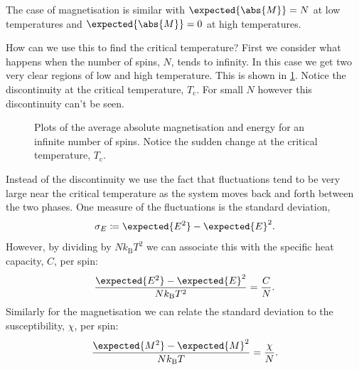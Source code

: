 \documentclass[fleqn]{NotesClass}
\newcommand*{\boltzmann}{k_{\mathrm{B}}}
\begin{document}
    The case of magnetisation is similar with \(\expected{\abs{M}} = N\) at low temperatures and \(\expected{\abs{M}} = 0\) at high temperatures.
    
    
    How can we use this to find the critical temperature?
    First we consider what happens when the number of spins, \(N\), tends to infinity.
    In this case we get two very clear regions of low and high temperature.
    This is shown in \cref{fig:averages for infinite spins}.
    Notice the discontinuity at the critical temperature, \(T_{\mathrm{c}}\).
    For small \(N\) however this discontinuity can't be seen.
    
    \begin{figure}
        \caption[Average absolute magnetisation and energy for an infinite number of spins.]{Plots of the average absolute magnetisation and energy for an infinite number of spins. Notice the sudden change at the critical temperature, \(T_{\mathrm{c}}\).}
        \label{fig:averages for infinite spins}
    \end{figure}
    
    Instead of the discontinuity we use the fact that fluctuations tend to be very large near the critical temperature as the system moves back and forth between the two phases.
    One measure of the fluctuations is the standard deviation,
    \begin{equation}
        \sigma_E \coloneqq \expected{E^2} - \expected{E}^2.
    \end{equation}
    However, by dividing by \(N\boltzmann T^2\) we can associate this with the specific heat capacity, \(C\), per spin:
    \begin{equation}
        \frac{\expected{E^2} - \expected{E}^2}{N\boltzmann T^2} = \frac{C}{N}.
    \end{equation}
    Similarly for the magnetisation we can relate the standard deviation to the susceptibility, \(\chi\), per spin:
    \begin{equation}
        \frac{\expected{M^2} - \expected{M}^2}{N\boltzmann T} = \frac{\chi}{N}.
    \end{equation}
    
\end{document}
